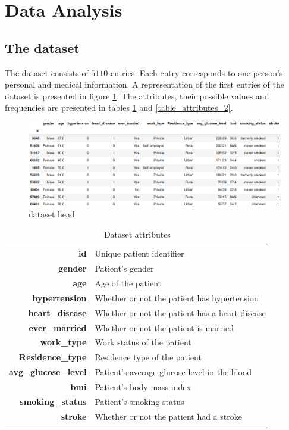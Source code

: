 \section{Data Analysis}

\subsection{The dataset}
The dataset consists of $5110$ entries. Each entry corresponds to one person's personal and medical 
information. A representation of the first entries of the dataset is presented in figure 
\ref{dataset_head}. The attributes, their possible values and frequencies are presented in tables 
\ref{table_attributes_1} and \ref{table_attributes_2}.


\begin{figure}[H]
\centering
\includegraphics[scale=0.5]{figures/dataset_head.png}
\caption{dataset head}
\label{dataset_head}
\end{figure}

\begin{table}[H]\begin{tabular}{rm{11cm}}
 \textbf{id} & Unique patient identifier\\
 \textbf{gender} & Patient's gender\\
 \textbf{age} & Age of the patient\\
 \textbf{hypertension}   & Whether or not the patient has hypertension\\
 \textbf{heart\_disease} & Whether or not the patient has a heart disease\\
 \textbf{ever\_married} & Whether or not the patient is married\\
 \textbf{work\_type} & Work status of the patient\\
 \textbf{Residence\_type} & Residence type of the patient\\
 \textbf{avg\_glucose\_level} & Patient's average glucose level in the blood\\
 \textbf{bmi} & Patient's body mass index\\
 \textbf{smoking\_status} & Patient's smoking status\\
 \textbf{stroke} & Whether or not the patient had a stroke
\end{tabular}
\caption{Dataset attributes}
\label{table_attributes_1}
\end{table}

